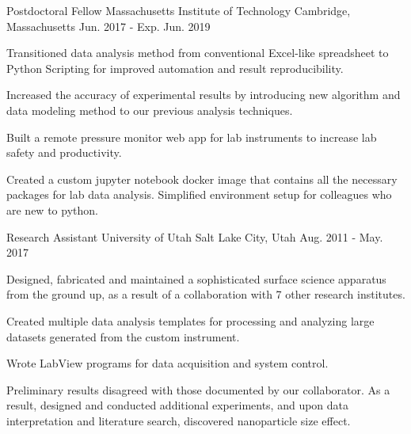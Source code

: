


\begin{cventries}


\cventry
{Postdoctoral Fellow}
{Massachusetts Institute of Technology}
{Cambridge, Massachusetts}
{Jun. 2017 - Exp. Jun. 2019}
{
\begin{cvitems}
\item {Transitioned data analysis method from conventional Excel-like
    spreadsheet to Python Scripting for improved automation and result
    reproducibility.}
\item {Increased the accuracy of experimental results by introducing new
    algorithm and data modeling method to our previous analysis techniques.}
\item {Built a remote pressure monitor web app for lab instruments to increase
    lab safety and productivity.}
\item {Created a custom jupyter notebook docker image that contains all the
    necessary packages for lab data analysis. Simplified environment setup for
    colleagues who are new to python.}
\end{cvitems}
}


\cventry
{Research Assistant}
{University of Utah}
{Salt Lake City, Utah}
{Aug. 2011 - May. 2017}
{
\begin{cvitems}
\item {Designed, fabricated and maintained a sophisticated surface science
    apparatus from the ground up, as a result of a collaboration with 7 other
    research institutes.}
\item {Created multiple data analysis templates for processing and analyzing
    large datasets generated from the custom instrument.}
\item {Wrote LabView programs for data acquisition and system control.}
\item {Preliminary results disagreed with those documented by our collaborator.
    As a result, designed and conducted additional experiments, and upon data
    interpretation and literature search, discovered nanoparticle size effect.}
\end{cvitems}
}


\end{cventries}